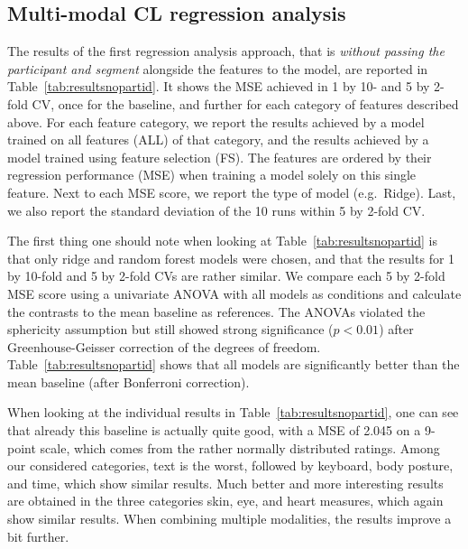 \documentclass[output=paper]{langsci/langscibook}
\begin{document}
\subsection{Multi-modal CL regression analysis}\largerpage
The results of the first regression analysis approach, that is \textit{without passing the participant and segment} alongside the features to the model, are reported in Table~\ref{tab:resultsnopartid}.
It shows the MSE achieved in 1 by 10- and 5 by 2-fold CV, once for the baseline, and further for each category of features described above. For each feature category, we report the results achieved by a model trained on all features (ALL) of that category, and the results achieved by a model trained using feature selection (FS). The features are ordered by their regression performance (MSE) when training a model solely on this single feature. %
Next to each MSE score, we report the type of model (e.g.\ Ridge). Last, we also report the standard deviation of the 10 runs within 5 by 2-fold CV.

The first thing one should note when looking at Table~\ref{tab:resultsnopartid} is that only ridge and random forest models were chosen, and that the results for 1 by 10-fold and 5 by 2-fold CVs are rather similar. %
We compare each 5 by 2-fold MSE score using a univariate ANOVA with all models as conditions and calculate the contrasts to the mean baseline as references. The ANOVAs violated the sphericity assumption but still showed strong significance ($p<0.01$) after Greenhouse-Geisser correction of the degrees of freedom. Table~\ref{tab:resultsnopartid} shows that all models are significantly better than the mean baseline (after Bonferroni correction).

When looking at the individual results in Table~\ref{tab:resultsnopartid}, one can see that already this baseline is actually quite good, with a MSE of 2.045 on a 9-point scale, which comes from the rather normally distributed ratings. Among our considered categories, text is the worst, followed by keyboard, body posture, and time, which show similar results. Much better and more interesting results are obtained in the three categories skin, eye, and heart measures, which again show similar results. When combining multiple modalities, the results improve a bit further.
\end{document}
